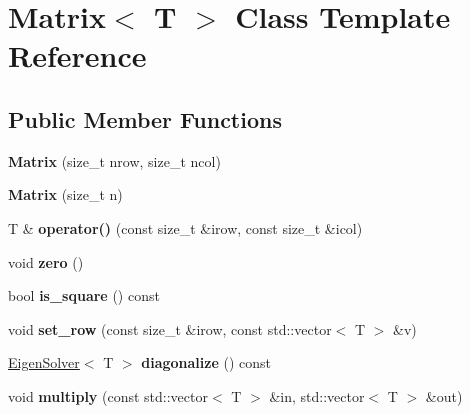 \hypertarget{classMatrix}{}\section{Matrix$<$ T $>$ Class Template Reference}
\label{classMatrix}
\subsection*{Public Member Functions}
\begin{DoxyCompactItemize}
\item 
{\bfseries Matrix} (size\+\_\+t nrow, size\+\_\+t ncol)\hypertarget{classMatrix_ac82b39c1bd1ab8d1edb614dc26022efe}{}\label{classMatrix_ac82b39c1bd1ab8d1edb614dc26022efe}

\item 
{\bfseries Matrix} (size\+\_\+t n)\hypertarget{classMatrix_a534f00804bdaeec3ba10b3c47f18c462}{}\label{classMatrix_a534f00804bdaeec3ba10b3c47f18c462}

\item 
T \& {\bfseries operator()} (const size\+\_\+t \&irow, const size\+\_\+t \&icol)\hypertarget{classMatrix_a3a1a68aa3f2cff9cd51ee89f45b1d553}{}\label{classMatrix_a3a1a68aa3f2cff9cd51ee89f45b1d553}

\item 
void {\bfseries zero} ()\hypertarget{classMatrix_ac473549ae56d450f6622d8ce686278b2}{}\label{classMatrix_ac473549ae56d450f6622d8ce686278b2}

\item 
bool {\bfseries is\+\_\+square} () const \hypertarget{classMatrix_a409953ed996c2845739665a3a050464b}{}\label{classMatrix_a409953ed996c2845739665a3a050464b}

\item 
void {\bfseries set\+\_\+row} (const size\+\_\+t \&irow, const std\+::vector$<$ T $>$ \&v)\hypertarget{classMatrix_a79dc71744f2d2a6b5ec9d987e45c7c95}{}\label{classMatrix_a79dc71744f2d2a6b5ec9d987e45c7c95}

\item 
\hyperlink{classEigenSolver}{Eigen\+Solver}$<$ T $>$ {\bfseries diagonalize} () const \hypertarget{classMatrix_abf3e9483992ebbfdff1153245c89b056}{}\label{classMatrix_abf3e9483992ebbfdff1153245c89b056}

\item 
void {\bfseries multiply} (const std\+::vector$<$ T $>$ \&in, std\+::vector$<$ T $>$ \&out)\hypertarget{classMatrix_a1bb8e167842c1bd3eac4539cfa657396}{}\label{classMatrix_a1bb8e167842c1bd3eac4539cfa657396}


\end{DoxyCompactItemize}
